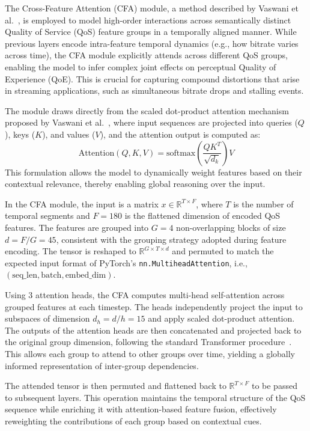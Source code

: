 The Cross-Feature Attention (CFA) module, a method described by Vaswani et al.~\cite{vaswani2017attention}, is employed to model high-order interactions across semantically distinct Quality of Service (QoS) feature groups in a temporally aligned manner. While previous layers encode intra-feature temporal dynamics (e.g., how bitrate varies across time), the CFA module explicitly attends across different QoS groups, enabling the model to infer complex joint effects on perceptual Quality of Experience (QoE). This is crucial for capturing compound distortions that arise in streaming applications, such as simultaneous bitrate drops and stalling events.

The module draws directly from the scaled dot-product attention mechanism proposed by Vaswani et al.~\cite{vaswani2017attention}, where input sequences are projected into queries ($Q$), keys ($K$), and values ($V$), and the attention output is computed as:
\[
\text{Attention}(Q, K, V) = \text{softmax}\left(\frac{QK^T}{\sqrt{d_k}}\right)V
\]
This formulation allows the model to dynamically weight features based on their contextual relevance, thereby enabling global reasoning over the input.

In the CFA module, the input is a matrix $x \in \mathbb {R}^{T \times F}$, where $T$ is the number of temporal segments and $F = 180$ is the flattened dimension of encoded QoS features. The features are grouped into $G=4$ non-overlapping blocks of size $d = F/G = 45$, consistent with the grouping strategy adopted during feature encoding. The tensor is reshaped to $\mathbb{R}^{G \times T \times d}$ and permuted to match the expected input format of PyTorch's \texttt{nn.MultiheadAttention}, i.e., $(\text{seq\_len}, \text{batch}, \text{embed\_dim})$.

Using 3 attention heads, the CFA computes multi-head self-attention across grouped features at each timestep. The heads independently project the input to subspaces of dimension $d_h = d / h = 15$ and apply scaled dot-product attention. The outputs of the attention heads are then concatenated and projected back to the original group dimension, following the standard Transformer procedure~\cite{vaswani2017attention}. This allows each group to attend to other groups over time, yielding a globally informed representation of inter-group dependencies.

The attended tensor is then permuted and flattened back to $\mathbb {R}^{T \times F}$ to be passed to subsequent layers. This operation maintains the temporal structure of the QoS sequence while enriching it with attention-based feature fusion, effectively reweighting the contributions of each group based on contextual cues.

